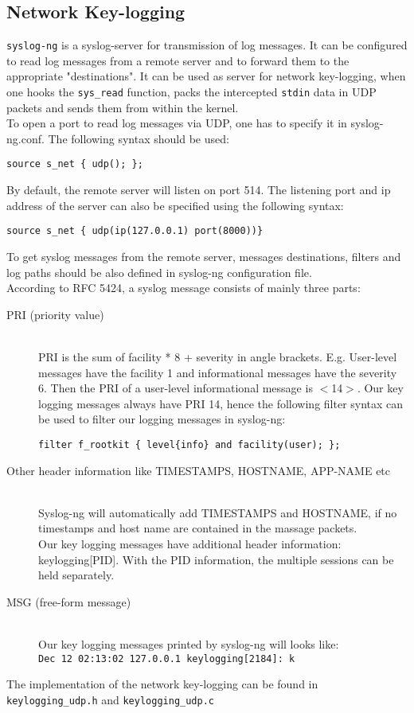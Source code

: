 \subsection{Network Key-logging}
\texttt{syslog-ng} is a syslog-server for transmission of log messages. It can be configured to read log messages from a remote server and to forward them to the appropriate "destinations". It can be used as server for network key-logging, when one hooks the \texttt{sys\_read} function, packs the intercepted \texttt{stdin} data in UDP packets and sends them from within the kernel.\\ 
To open a port to read log messages via UDP, one has to specify it in syslog-ng.conf. The following syntax should be used:
\lstset{escapechar=,style=customc}
\begin{lstlisting}
source s_net { udp(); };
\end{lstlisting}
By default, the remote server will listen on port 514. The listening port and ip address of the server can also be specified using the following syntax:
\lstset{escapechar=,style=customc}
\begin{lstlisting}
source s_net { udp(ip(127.0.0.1) port(8000))}
\end{lstlisting}
To get syslog messages from the remote server, messages destinations, filters and log paths should be also defined in syslog-ng configuration file.\\
According to RFC 5424, a syslog message consists of mainly three parts:
\begin{description}
\item[PRI (priority value)] \hfill \\
PRI is the sum of facility * 8 + severity in angle brackets. E.g. User-level
messages have the facility 1 and informational messages have the severity 6.
Then the PRI of a user-level informational message is $<$14$>$. 
Our key logging messages  always have PRI 14, hence the following filter 
syntax can be used to filter our logging messages in syslog-ng:
\lstset{escapechar=,style=customc}
\begin{lstlisting}
filter f_rootkit { level{info} and facility(user); };
\end{lstlisting}
\item[Other header information like TIMESTAMPS, HOSTNAME, APP-NAME etc] \hfill \\
Syslog-ng will automatically add TIMESTAMPS and HOSTNAME, if no timestamps 
and host name are contained in the massage packets.\\ 
Our key logging messages have additional header information: keylogging[PID]. 
With the PID information, the multiple sessions can be held separately.
\item[MSG (free-form message)]\hfill\\
Our key logging messages printed by syslog-ng will looks like:
\\
\verb+Dec 12 02:13:02 127.0.0.1 keylogging[2184]: k+
\end{description}
The implementation of the network key-logging can be found in 
\verb+keylogging_udp.h+ and \verb+keylogging_udp.c+\\
